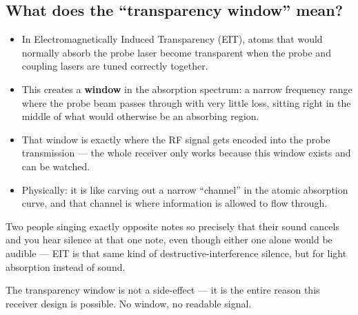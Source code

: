 \documentclass[11pt]{article}
\begin{document}
\subsection*{What does the ``transparency window'' mean?}
\begin{itemize}
\item In Electromagnetically Induced Transparency (EIT), atoms that would normally absorb the probe laser become transparent when the probe and coupling lasers are tuned correctly together.
\item This creates a \textbf{window} in the absorption spectrum: a narrow frequency range where the probe beam passes through with very little loss, sitting right in the middle of what would otherwise be an absorbing region.
\item That window is exactly where the RF signal gets encoded into the probe transmission --- the whole receiver only works because this window exists and can be watched.
\item Physically: it is like carving out a narrow ``channel'' in the atomic absorption curve, and that channel is where information is allowed to flow through.
\end{itemize}
\begin{plain}
Two people singing exactly opposite notes so precisely that their sound cancels and you hear silence at that one note, even though either one alone would be audible --- EIT is that same kind of destructive-interference silence, but for light absorption instead of sound.
\end{plain}
\begin{takeaway}
The transparency window is not a side-effect --- it is the entire reason this receiver design is possible. No window, no readable signal.
\end{takeaway}
\end{document}
